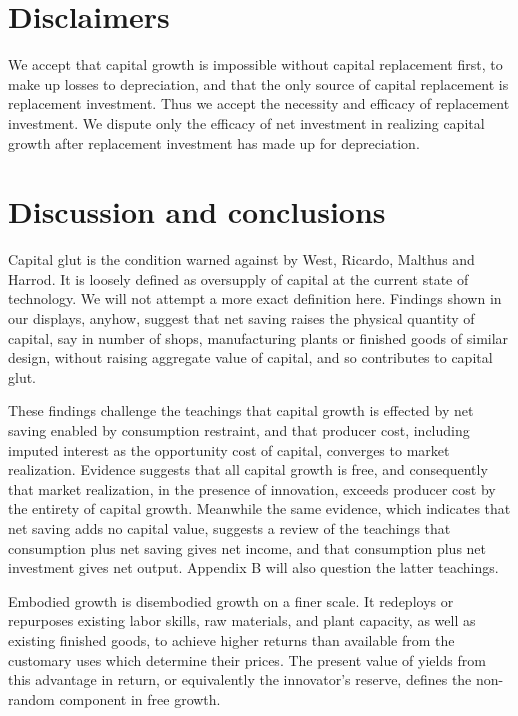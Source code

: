 \documentclass[a4paper,fleqn]{latex_styles/cas-sc}
\begin{document}
\hypertarget{disclaimers}{%
\section{Disclaimers}\label{disclaimers}}

We accept that capital growth is impossible without capital replacement first, to make up losses to depreciation, and that the only source of capital replacement is replacement investment. Thus we accept the necessity and efficacy of replacement investment. We dispute only the efficacy of net investment in realizing capital growth after replacement investment has made up for depreciation.

\hypertarget{discussion-and-conclusions}{%
\section{Discussion and conclusions}\label{discussion-and-conclusions}}

Capital glut is the condition warned against by West, Ricardo, Malthus
and Harrod. It is loosely defined as oversupply of capital at the
current state of technology. We will not attempt a more exact definition
here. Findings shown in our displays, anyhow, suggest that net
saving raises the physical quantity of capital, say in number of
shops, manufacturing plants or finished goods of similar design, without
raising aggregate value of capital, and so contributes to capital glut.

These findings challenge the teachings that capital growth is effected
by net saving enabled by consumption restraint, and that producer
cost, including imputed interest as the opportunity cost of capital,
converges to market realization. Evidence suggests that all capital growth is free, and
consequently that market realization, in the presence of innovation,
exceeds producer cost by the entirety of capital growth. Meanwhile the same evidence, which indicates that net saving adds no capital value, suggests a review of the teachings that consumption plus net saving gives net income, and that consumption plus net investment gives net output. Appendix B will also question the latter teachings.

Embodied growth is disembodied growth on a finer scale. It redeploys or
repurposes existing labor skills, raw materials, and plant capacity, as
well as existing finished goods, to achieve higher returns than
available from the customary uses which determine their prices. The
present value of yields from this advantage in return, or equivalently
the innovator's reserve, defines the non-random component in free growth.
\end{document}
